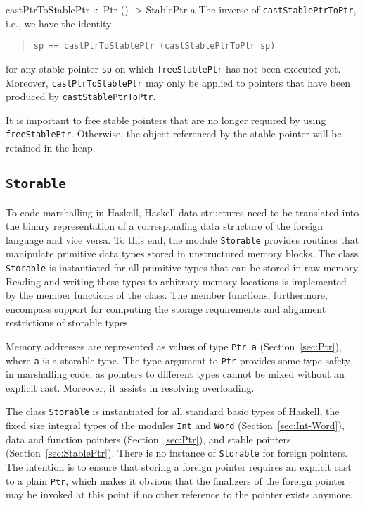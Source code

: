 \documentclass[a4paper,twoside]{article}
\makeatletter
\newcommand{\code}[1]{\texttt{#1}}      %
\newenvironment{codedesc}{%
  \list{}{\labelwidth\z@
    \let\makelabel\codedesclabel}
  }{%
  \endlist
  }
\newcommand*{\codedesclabel}[1]{%
  \hspace{-\leftmargin}
  \parbox[b]{\labelwidth}{\makebox[0pt][l]{\code{#1}}\\}\hfil\relax
  }
\makeatother
\begin{document}
\begin{codedesc}
\item[castPtrToStablePtr ::\ Ptr () -> StablePtr a] The inverse of
  \code{castStablePtrToPtr}, i.e., we have the identity
  \begin{quote}
\begin{verbatim}
sp == castPtrToStablePtr (castStablePtrToPtr sp)
\end{verbatim}
  \end{quote}
  for any stable pointer \code{sp} on which \code{freeStablePtr} has not been
  executed yet.  Moreover, \code{castPtrToStablePtr} may only be applied to
  pointers that have been produced by \code{castStablePtrToPtr}.
\end{codedesc}

It is important to free stable pointers that are no longer required by using
\code{freeStablePtr}.  Otherwise, the object referenced by the stable pointer
will be retained in the heap.


\subsection{\code{Storable}}
\label{sec:Storable}

To code marshalling in Haskell, Haskell data structures need to be translated
into the binary representation of a corresponding data structure of the
foreign language and vice versa.  To this end, the module \code{Storable}
provides routines that manipulate primitive data types stored in unstructured
memory blocks.  The class \code{Storable} is instantiated for all primitive
types that can be stored in raw memory.  Reading and writing these types to
arbitrary memory locations is implemented by the member functions of the
class.  The member functions, furthermore, encompass support for computing the
storage requirements and alignment restrictions of storable types.

Memory addresses are represented as values of type \code{Ptr a}
(Section~\ref{sec:Ptr}), where \code{a} is a storable type.  The type argument
to \code{Ptr} provides some type safety in marshalling code, as pointers to
different types cannot be mixed without an explicit cast.  Moreover, it
assists in resolving overloading.

The class \code{Storable} is instantiated for all standard basic types of
Haskell, the fixed size integral types of the modules \code{Int} and
\code{Word} (Section~\ref{sec:Int-Word}), data and function pointers
(Section~\ref{sec:Ptr}), and stable pointers (Section~\ref{sec:StablePtr}).
There is no instance of \code{Storable} for foreign pointers.  The intention
is to ensure that storing a foreign pointer requires an explicit cast to a
plain \code{Ptr}, which makes it obvious that the finalizers of the foreign
pointer may be invoked at this point if no other reference to the pointer
exists anymore.
\end{document}

